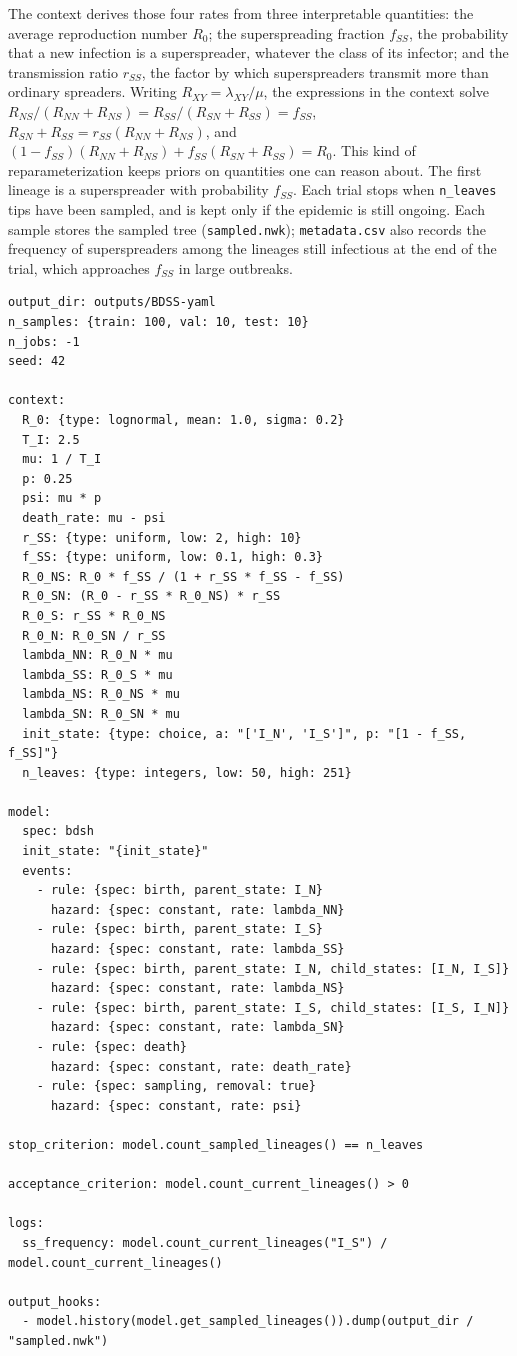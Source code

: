 \documentclass[11pt]{article}
\begin{document}
The context derives those four rates from three interpretable quantities: the
average reproduction number $R_0$; the superspreading fraction $f_{SS}$, the
probability that a new infection is a superspreader, whatever the class of its
infector; and the transmission ratio $r_{SS}$, the factor by which
superspreaders transmit more than ordinary spreaders. Writing $R_{XY} =
  \lambda_{XY}/\mu$, the expressions in the context solve $R_{NS}/(R_{NN}+R_{NS})
  = R_{SS}/(R_{SN}+R_{SS}) = f_{SS}$, $R_{SN}+R_{SS} = r_{SS}(R_{NN}+R_{NS})$, and
$(1-f_{SS})(R_{NN}+R_{NS}) + f_{SS}(R_{SN}+R_{SS}) = R_0$. This kind of
reparameterization keeps priors on quantities one can reason about. The first
lineage is a superspreader with probability $f_{SS}$. Each trial stops when
\texttt{n\_leaves} tips have been sampled, and is kept only if the epidemic is
still ongoing. Each sample stores the sampled tree (\texttt{sampled.nwk});
\texttt{metadata.csv} also records the frequency of superspreaders among the
lineages still infectious at the end of the trial, which approaches $f_{SS}$ in
large outbreaks.

\begin{lstlisting}[style=cfg]
output_dir: outputs/BDSS-yaml
n_samples: {train: 100, val: 10, test: 10}
n_jobs: -1
seed: 42

context:
  R_0: {type: lognormal, mean: 1.0, sigma: 0.2}
  T_I: 2.5
  mu: 1 / T_I
  p: 0.25
  psi: mu * p
  death_rate: mu - psi
  r_SS: {type: uniform, low: 2, high: 10}
  f_SS: {type: uniform, low: 0.1, high: 0.3}
  R_0_NS: R_0 * f_SS / (1 + r_SS * f_SS - f_SS)
  R_0_SN: (R_0 - r_SS * R_0_NS) * r_SS
  R_0_S: r_SS * R_0_NS
  R_0_N: R_0_SN / r_SS
  lambda_NN: R_0_N * mu
  lambda_SS: R_0_S * mu
  lambda_NS: R_0_NS * mu
  lambda_SN: R_0_SN * mu
  init_state: {type: choice, a: "['I_N', 'I_S']", p: "[1 - f_SS, f_SS]"}
  n_leaves: {type: integers, low: 50, high: 251}

model:
  spec: bdsh
  init_state: "{init_state}"
  events:
    - rule: {spec: birth, parent_state: I_N}
      hazard: {spec: constant, rate: lambda_NN}
    - rule: {spec: birth, parent_state: I_S}
      hazard: {spec: constant, rate: lambda_SS}
    - rule: {spec: birth, parent_state: I_N, child_states: [I_N, I_S]}
      hazard: {spec: constant, rate: lambda_NS}
    - rule: {spec: birth, parent_state: I_S, child_states: [I_S, I_N]}
      hazard: {spec: constant, rate: lambda_SN}
    - rule: {spec: death}
      hazard: {spec: constant, rate: death_rate}
    - rule: {spec: sampling, removal: true}
      hazard: {spec: constant, rate: psi}

stop_criterion: model.count_sampled_lineages() == n_leaves

acceptance_criterion: model.count_current_lineages() > 0

logs:
  ss_frequency: model.count_current_lineages("I_S") / model.count_current_lineages()

output_hooks:
  - model.history(model.get_sampled_lineages()).dump(output_dir / "sampled.nwk")
\end{lstlisting}
\end{document}

